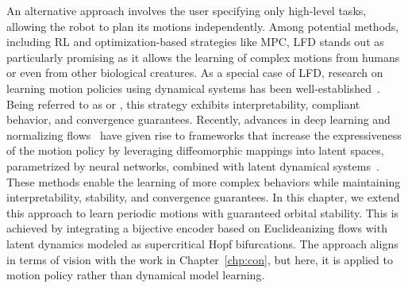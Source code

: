 \begin{foreword}
    An alternative approach involves the user specifying only high-level tasks, allowing the robot to plan its motions independently. Among potential methods, including \gls{RL} and optimization-based strategies like \gls{MPC}, \gls{LFD} stands out as particularly promising as it allows the learning of complex motions from humans or even from other biological creatures. As a special case of \gls{LFD}, research on learning motion policies using dynamical systems has been well-established~\citep {ijspeert2013dynamical}. Being referred to as  or , this strategy exhibits interpretability, compliant behavior, and convergence guarantees. Recently, advances in deep learning and normalizing flows~\citep{kobyzev2020normalizing} have given rise to frameworks that increase the expressiveness of the motion policy by leveraging diffeomorphic mappings into latent spaces, parametrized by neural networks, combined with latent dynamical systems~\citep{rana2020euclideanizing, perez2023stable, zhi2024teaching}. These methods enable the learning of more complex behaviors while maintaining interpretability, stability, and convergence guarantees.
    In this chapter, we extend this approach to learn periodic motions with guaranteed orbital stability. This is achieved by integrating a bijective encoder based on Euclideanizing flows with latent dynamics modeled as supercritical Hopf bifurcations. The approach aligns in terms of vision with the work in Chapter~\ref{chp:con}, but here, it is applied to motion policy rather than dynamical model learning.
\end{foreword}

\pagebreak

